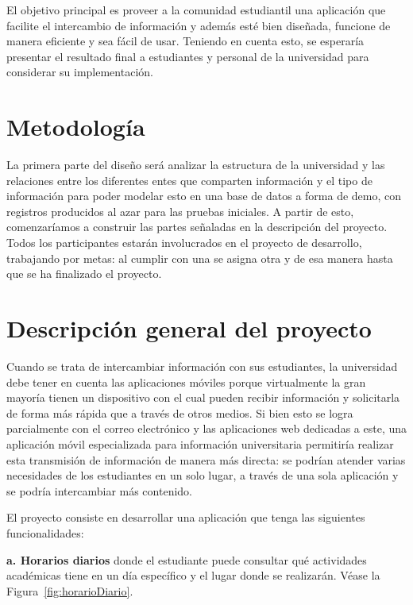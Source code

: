 \documentclass[12pt]{article}
\begin{document}
El objetivo principal es proveer a la comunidad estudiantil una aplicación que facilite el intercambio de información y además esté bien diseñada, funcione de manera eficiente y sea fácil de usar. Teniendo en cuenta esto, se esperaría presentar el resultado final a estudiantes y personal de la universidad para considerar su implementación.

\section{Metodología} 


La primera parte del diseño será analizar la estructura de la universidad y las relaciones entre los diferentes entes que comparten información y el tipo de información para poder modelar esto en una base de datos a forma de demo, con registros producidos al azar para las pruebas iniciales. A partir de esto, comenzaríamos a construir las partes señaladas en la descripción del proyecto. Todos los participantes estarán involucrados en el proyecto de desarrollo, trabajando por metas: al cumplir con una se asigna otra y de esa manera hasta que se ha finalizado el proyecto.


\section{Descripción general del proyecto}

Cuando se trata de intercambiar información con sus estudiantes, la universidad debe tener en cuenta las aplicaciones móviles porque virtualmente la gran mayor\'ia tienen un dispositivo con el cual pueden recibir información y solicitarla de forma más rápida que a través de otros medios. Si bien esto se logra parcialmente con el correo electrónico y las aplicaciones web dedicadas a este, una aplicación m\'ovil especializada para información universitaria permitiría realizar esta transmisi\'on de informaci\'on de manera más directa: se podrían atender varias necesidades de los estudiantes en un solo lugar, a través de una sola aplicación y se podría intercambiar más contenido.

\newpage

El proyecto consiste en desarrollar una aplicación que tenga las siguientes funcionalidades:

\textbf{a. Horarios diarios} donde el estudiante puede consultar qué actividades académicas tiene en un día específico y el lugar donde se realizarán. Véase la Figura~\ref{fig:horarioDiario}.\\
\end{document}
